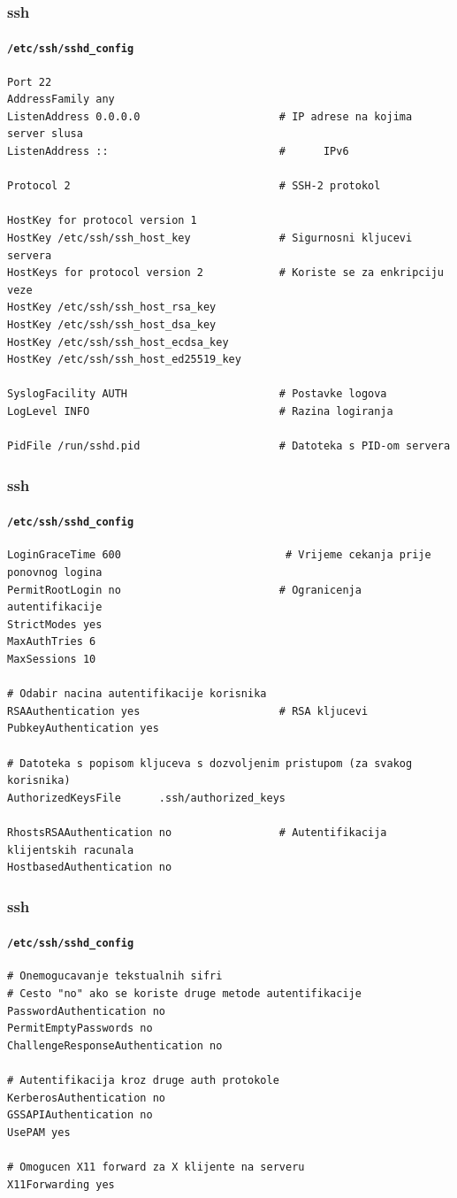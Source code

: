 \documentclass[t,table,usenames,dvipsnames]{beamer}
\begin{document}
\begin{frame}[fragile]
	\frametitle{ssh}
	\framesubtitle{\texttt{/etc/ssh/sshd\_config}}
	\scriptsize
	\begin{verbatim}
Port 22
AddressFamily any
ListenAddress 0.0.0.0                      # IP adrese na kojima server slusa
ListenAddress ::                           #      IPv6

Protocol 2                                 # SSH-2 protokol

HostKey for protocol version 1
HostKey /etc/ssh/ssh_host_key              # Sigurnosni kljucevi servera
HostKeys for protocol version 2            # Koriste se za enkripciju veze
HostKey /etc/ssh/ssh_host_rsa_key
HostKey /etc/ssh/ssh_host_dsa_key
HostKey /etc/ssh/ssh_host_ecdsa_key
HostKey /etc/ssh/ssh_host_ed25519_key

SyslogFacility AUTH                        # Postavke logova
LogLevel INFO                              # Razina logiranja

PidFile /run/sshd.pid                      # Datoteka s PID-om servera
	\end{verbatim}


\end{frame}

\begin{frame}[fragile]
	\frametitle{ssh}
	\framesubtitle{\texttt{/etc/ssh/sshd\_config}}
	\scriptsize
	\begin{verbatim}
LoginGraceTime 600                          # Vrijeme cekanja prije ponovnog logina
PermitRootLogin no                         # Ogranicenja autentifikacije
StrictModes yes
MaxAuthTries 6
MaxSessions 10

# Odabir nacina autentifikacije korisnika
RSAAuthentication yes                      # RSA kljucevi
PubkeyAuthentication yes

# Datoteka s popisom kljuceva s dozvoljenim pristupom (za svakog korisnika)
AuthorizedKeysFile      .ssh/authorized_keys

RhostsRSAAuthentication no                 # Autentifikacija klijentskih racunala
HostbasedAuthentication no
	\end{verbatim}

\end{frame}

\begin{frame}[fragile]
	\frametitle{ssh}
	\framesubtitle{\texttt{/etc/ssh/sshd\_config}}
	\scriptsize
	\begin{verbatim}
# Onemogucavanje tekstualnih sifri
# Cesto "no" ako se koriste druge metode autentifikacije
PasswordAuthentication no
PermitEmptyPasswords no
ChallengeResponseAuthentication no

# Autentifikacija kroz druge auth protokole
KerberosAuthentication no
GSSAPIAuthentication no
UsePAM yes

# Omogucen X11 forward za X klijente na serveru
X11Forwarding yes

	\end{verbatim}

\end{frame}
\end{document}
